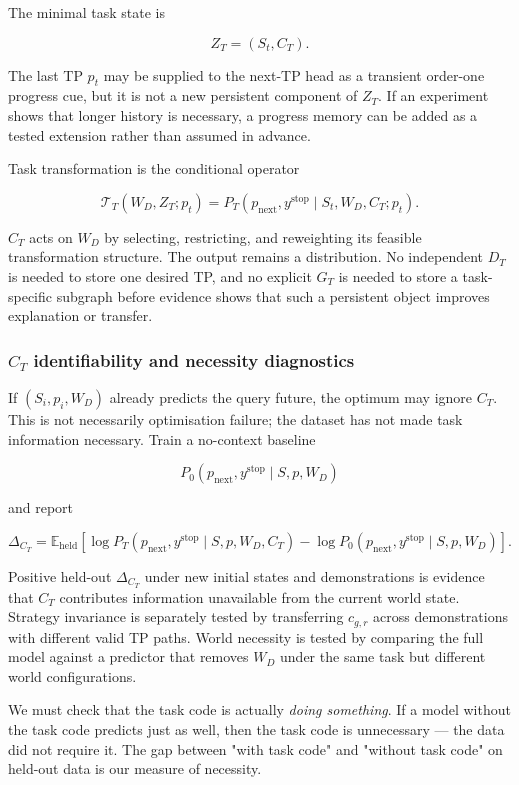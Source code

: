 \documentclass[11pt]{article}
\newenvironment{plainword}{%
  \par\medskip\noindent\begin{minipage}{\textwidth}%
  \color{gray!75!black}\small\itshape
}{%
  \end{minipage}\par\medskip}
\begin{document}
The minimal task state is

\[
\boxed{Z_T=(S_t,C_T).}
\]

The last TP $p_t$ may be supplied to the next-TP head as a transient order-one progress cue, but it is not a new persistent
component of $Z_T$. If an experiment shows that longer history is necessary, a progress memory can be added as a tested extension
rather than assumed in advance.

Task transformation is the conditional operator

\[
\boxed{
\mathcal T_T(W_D,Z_T;p_t)=
P_T(p_{\mathrm{next}},y^{\mathrm{stop}}\mid
S_t,W_D,C_T;p_t).}
\]

$C_T$ acts on $W_D$ by selecting, restricting, and reweighting its feasible transformation structure. The output remains a
distribution. No independent $D_T$ is needed to store one desired TP, and no explicit $G_T$ is needed to store a task-specific
subgraph before evidence shows that such a persistent object improves explanation or transfer.

\subsubsection*{$C_T$ identifiability and necessity diagnostics}

If $(S_i,p_i,W_D)$ already predicts the query future, the optimum may ignore $C_T$. This is not necessarily optimisation failure; the
dataset has not made task information necessary. Train a no-context baseline

\[
P_0(p_{\mathrm{next}},y^{\mathrm{stop}}\mid S,p,W_D)
\]

and report

\[
\boxed{
\Delta_{C_T}=
\mathbb E_{\mathrm{held}}
\left[
\log P_T(p_{\mathrm{next}},y^{\mathrm{stop}}\mid S,p,W_D,C_T)
-\log P_0(p_{\mathrm{next}},y^{\mathrm{stop}}\mid S,p,W_D)
\right].}
\]

Positive held-out $\Delta_{C_T}$ under new initial states and demonstrations is evidence that $C_T$ contributes information
unavailable from the current world state. Strategy invariance is separately tested by transferring $c_{g,r}$ across demonstrations
with different valid TP paths. World necessity is tested by comparing the full model against a predictor that removes $W_D$ under the
same task but different world configurations.

\begin{plainword}
We must check that the task code is actually \emph{doing something}. If a model without the task code predicts just as well, then the
task code is unnecessary --- the data did not require it. The gap between "with task code" and "without task code" on held-out data
is our measure of necessity.
\end{plainword}
\end{document}

